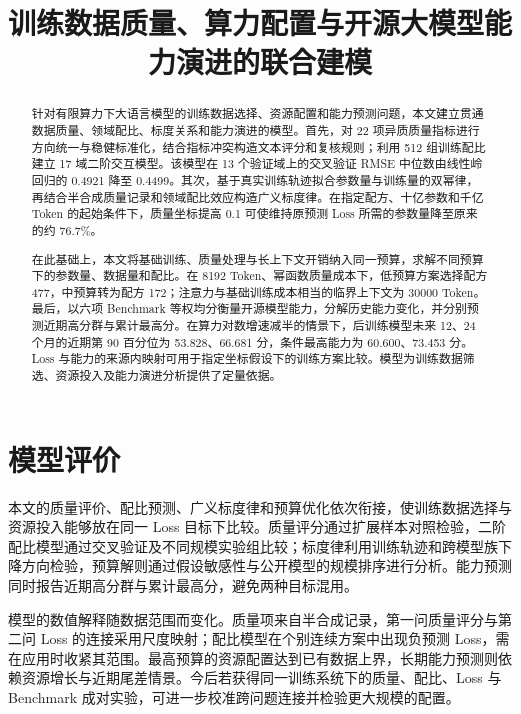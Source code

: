 \documentclass[bwprint]{gmcmthesis}
\title{训练数据质量、算力配置与开源大模型能力演进的联合建模}
\begin{document}
\maketitle

\begin{abstract}

针对有限算力下大语言模型的训练数据选择、资源配置和能力预测问题，本文建立贯通数据质量、领域配比、标度关系和能力演进的模型。首先，对 22 项异质质量指标进行方向统一与稳健标准化，结合指标冲突构造文本评分和复核规则；利用 512 组训练配比建立 17 域二阶交互模型。该模型在 13 个验证域上的交叉验证 RMSE 中位数由线性岭回归的 0.4921 降至 0.4499。其次，基于真实训练轨迹拟合参数量与训练量的双幂律，再结合半合成质量记录和领域配比效应构造广义标度律。在指定配方、十亿参数和千亿 Token 的起始条件下，质量坐标提高 0.1 可使维持原预测 Loss 所需的参数量降至原来的约 76.7\%。

在此基础上，本文将基础训练、质量处理与长上下文开销纳入同一预算，求解不同预算下的参数量、数据量和配比。在 8192 Token、幂函数质量成本下，低预算方案选择配方 477，中预算转为配方 172；注意力与基础训练成本相当的临界上下文为 30000 Token。最后，以六项 Benchmark 等权均分衡量开源模型能力，分解历史能力变化，并分别预测近期高分群与累计最高分。在算力对数增速减半的情景下，后训练模型未来 12、24 个月的近期第 90 百分位为 53.828、66.681 分，条件最高能力为 60.600、73.453 分。Loss 与能力的来源内映射可用于指定坐标假设下的训练方案比较。模型为训练数据筛选、资源投入及能力演进分析提供了定量依据。


\end{abstract}

\pagestyle{plain}

\maketoc

\clearpage









\section{模型评价}

本文的质量评价、配比预测、广义标度律和预算优化依次衔接，使训练数据选择与资源投入能够放在同一 Loss 目标下比较。质量评分通过扩展样本对照检验，二阶配比模型通过交叉验证及不同规模实验组比较；标度律利用训练轨迹和跨模型族下降方向检验，预算解则通过假设敏感性与公开模型的规模排序进行分析。能力预测同时报告近期高分群与累计最高分，避免两种目标混用。

模型的数值解释随数据范围而变化。质量项来自半合成记录，第一问质量评分与第二问 Loss 的连接采用尺度映射；配比模型在个别连续方案中出现负预测 Loss，需在应用时收紧其范围。最高预算的资源配置达到已有数据上界，长期能力预测则依赖资源增长与近期尾差情景。今后若获得同一训练系统下的质量、配比、Loss 与 Benchmark 成对实验，可进一步校准跨问题连接并检验更大规模的配置。



\end{document}
